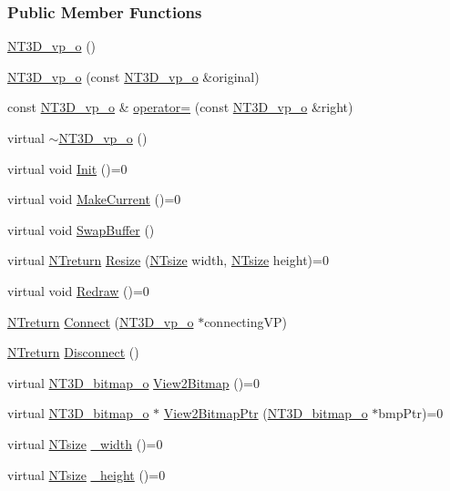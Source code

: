 \subsubsection*{Public Member Functions}
\begin{DoxyCompactItemize}
\item 
\hyperlink{class_n_t3_d__vp__o_a0205724b7c0914d534ee3d44398b0861}{NT3D\_\-vp\_\-o} ()
\item 
\hyperlink{class_n_t3_d__vp__o_aa845f1aeeace611bffa27ed69747fecd}{NT3D\_\-vp\_\-o} (const \hyperlink{class_n_t3_d__vp__o}{NT3D\_\-vp\_\-o} \&original)
\item 
const \hyperlink{class_n_t3_d__vp__o}{NT3D\_\-vp\_\-o} \& \hyperlink{class_n_t3_d__vp__o_af2dc40aba3c38e2bc26795f5ed2bf53e}{operator=} (const \hyperlink{class_n_t3_d__vp__o}{NT3D\_\-vp\_\-o} \&right)
\item 
virtual \hyperlink{class_n_t3_d__vp__o_a9e5bf4def8b5d8dd3203d289ec68af53}{$\sim$NT3D\_\-vp\_\-o} ()
\item 
virtual void \hyperlink{class_n_t3_d__vp__o_a1f1337ae08f52c0d3e3f6efd3afcdbd5}{Init} ()=0
\item 
virtual void \hyperlink{class_n_t3_d__vp__o_aedc795540953e702cc443560e04c4148}{MakeCurrent} ()=0
\item 
virtual void \hyperlink{class_n_t3_d__vp__o_a2d7dc967be0443bfa0fba033a7477d78}{SwapBuffer} ()
\item 
virtual \hyperlink{nt__types_8h_ab9564ee8f091e809d21b8451c6683c53}{NTreturn} \hyperlink{class_n_t3_d__vp__o_ade1de94401e3af133bc398ebbe308815}{Resize} (\hyperlink{nt__types_8h_a06c124f2e4469769b58230253ce0560b}{NTsize} width, \hyperlink{nt__types_8h_a06c124f2e4469769b58230253ce0560b}{NTsize} height)=0
\item 
virtual void \hyperlink{class_n_t3_d__vp__o_a44abbf4fa68027993d2be2a5ddac4536}{Redraw} ()=0
\item 
\hyperlink{nt__types_8h_ab9564ee8f091e809d21b8451c6683c53}{NTreturn} \hyperlink{class_n_t3_d__vp__o_a74df06e6c4f18abaecbaa40fbc7c6179}{Connect} (\hyperlink{class_n_t3_d__vp__o}{NT3D\_\-vp\_\-o} $\ast$connectingVP)
\item 
\hyperlink{nt__types_8h_ab9564ee8f091e809d21b8451c6683c53}{NTreturn} \hyperlink{class_n_t3_d__vp__o_a4b8a1d8783681c6e9859a6e87eed2636}{Disconnect} ()
\item 
virtual \hyperlink{class_n_t3_d__bitmap__o}{NT3D\_\-bitmap\_\-o} \hyperlink{class_n_t3_d__vp__o_a2efa8d95e404abf1b3d7a054e9b6f223}{View2Bitmap} ()=0
\item 
virtual \hyperlink{class_n_t3_d__bitmap__o}{NT3D\_\-bitmap\_\-o} $\ast$ \hyperlink{class_n_t3_d__vp__o_a991d5acf827a4fa05a2aacc693f4e7fa}{View2BitmapPtr} (\hyperlink{class_n_t3_d__bitmap__o}{NT3D\_\-bitmap\_\-o} $\ast$bmpPtr)=0
\item 
virtual \hyperlink{nt__types_8h_a06c124f2e4469769b58230253ce0560b}{NTsize} \hyperlink{class_n_t3_d__vp__o_a681be89436416268957e730c34b6bba2}{\_\-width} ()=0
\item 
virtual \hyperlink{nt__types_8h_a06c124f2e4469769b58230253ce0560b}{NTsize} \hyperlink{class_n_t3_d__vp__o_a96c819deb3509953ecfe4702f42bb997}{\_\-height} ()=0
\end{DoxyCompactItemize}
